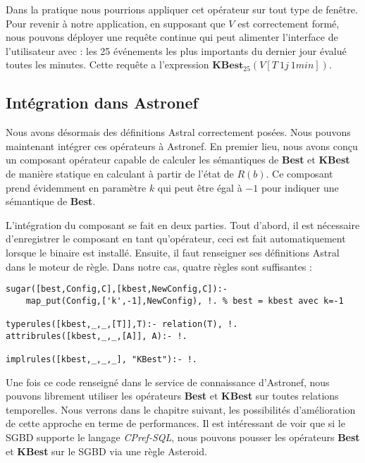 Dans la pratique nous pourrions appliquer cet opérateur sur tout type de fenêtre. Pour revenir à notre application, en supposant que $V$ est correctement formé, nous pouvons déployer une requête continue qui peut alimenter l'interface de l'utilisateur avec : les 25 événements les plus importants du dernier jour évalué toutes les minutes. Cette requête a l'expression $\textbf{KBest}_{25}(V[T\ 1j\ 1min])$.

\subsection{Intégration dans Astronef}
Nous avons désormais des définitions Astral correctement posées. Nous pouvons maintenant intégrer ces opérateurs à Astronef. En premier lieu, nous avons conçu un composant opérateur capable de calculer les sémantiques de \textbf{Best} et \textbf{KBest} de manière statique en calculant à partir de l'état de $R(b)$. Ce composant prend évidemment en paramètre $k$ qui peut être égal à $-1$ pour indiquer une sémantique de \textbf{Best}.

L'intégration du composant se fait en deux parties. Tout d'abord, il est nécessaire d'enregistrer le composant en tant qu'opérateur, ceci est fait automatiquement lorsque le binaire est installé. Ensuite, il faut renseigner ses définitions Astral dans le moteur de règle. Dans notre cas, quatre règles sont suffisantes :
\begin{lstlisting}
sugar([best,Config,C],[kbest,NewConfig,C]):-
    map_put(Config,['k',-1],NewConfig), !. % best = kbest avec k=-1

typerules([kbest,_,_,[T]],T):- relation(T), !.
attribrules([kbest,_,_,[A]], A):- !.

implrules([kbest,_,_,_], "KBest"):- !.
\end{lstlisting}

Une fois ce code renseigné dans le service de connaissance d'Astronef, nous pouvons librement utiliser les opérateurs \textbf{Best} et \textbf{KBest} sur toutes relations temporelles. Nous verrons dans le chapitre suivant, les possibilités d'amélioration de cette approche en terme de performances. Il est intéressant de voir que si le SGBD supporte le langage \textit{CPref-SQL}, nous pouvons pousser les opérateurs \textbf{Best} et \textbf{KBest} sur le SGBD via une règle Asteroid. 